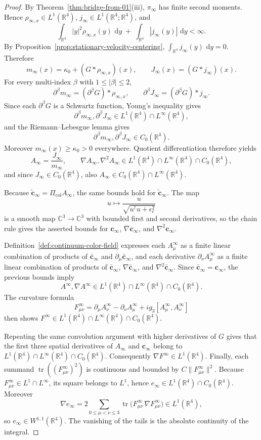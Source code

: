 \documentclass[11pt]{article}
\theoremstyle{definition}
\theoremstyle{remark}
\newcommand{\R}{\mathbb R}
\newcommand{\C}{\mathbb C}
\newcommand{\dd}{\,\mathrm d}
\newcommand{\tr}{\operatorname{tr}}
\begin{document}
\begin{proof}
By Theorem~\ref{thm:bridge-from-01}\textnormal{(iii)}, \(\pi_\infty\) has finite
second moments. Hence \(\rho_{\infty,x}\in L^1(\R^4)\), \(j_\infty\in L^1(\R^4;\R^4)\),
and
\[
\int_{\R^4}|y|^2\rho_{\infty,x}(y)\,\dd y
\;+\;
\int_{\R^4}|j_\infty(y)|\,\dd y
<\infty.
\]
By Proposition~\ref{prop:stationary-velocity-centering},
\(\int_{\R^4}j_\infty(y)\,\dd y=0\). Therefore
\[
m_\infty(x)=\kappa_0+(G*\rho_{\infty,x})(x),
\qquad
J_\infty(x)=(G*j_\infty)(x).
\]
For every multi-index \(\beta\) with \(1\le|\beta|\le2\),
\[
\partial^\beta m_\infty=(\partial^\beta G)*\rho_{\infty,x},
\qquad
\partial^\beta J_\infty=(\partial^\beta G)*j_\infty.
\]
Since each \(\partial^\beta G\) is a Schwartz function, Young's inequality gives
\[
\partial^\beta m_\infty,\partial^\beta J_\infty\in
L^1(\R^4)\cap L^\infty(\R^4),
\]
and the Riemann--Lebesgue lemma gives
\[
\partial^\beta m_\infty,\partial^\beta J_\infty\in C_0(\R^4).
\]
Moreover \(m_\infty(x)\ge\kappa_0>0\) everywhere. Quotient differentiation
therefore yields
\[
A_\infty=\frac{J_\infty}{m_\infty},
\qquad
\nabla A_\infty,\nabla^2A_\infty\in
L^1(\R^4)\cap L^\infty(\R^4)\cap C_0(\R^4),
\]
and since \(J_\infty\in C_0(\R^4)\), also \(A_\infty\in C_0(\R^4)\cap L^\infty(\R^4)\).

Because \(\tilde{\mathbf c}_\infty=\Pi_{\mathrm{col}}A_\infty\), the same bounds
hold for \(\tilde{\mathbf c}_\infty\). The map
\[
u\mapsto \frac{u}{\sqrt{u^\dagger u+\epsilon_c^2}}
\]
is a smooth map \(\C^3\to\C^3\) with bounded first and second derivatives, so
the chain rule gives the asserted bounds for \(\mathbf c_\infty\),
\(\nabla\mathbf c_\infty\), and \(\nabla^2\mathbf c_\infty\).

Definition~\ref{def:continuum-color-field} expresses each \(A_\mu^\infty\) as a
finite linear combination of products of \(\bar{\mathbf c}_\infty\) and
\(\partial_\mu\bar{\mathbf c}_\infty\), and each derivative \(\partial_\nu
A_\mu^\infty\) as a finite linear combination of products of
\(\bar{\mathbf c}_\infty\), \(\nabla\bar{\mathbf c}_\infty\), and
\(\nabla^2\bar{\mathbf c}_\infty\). Since \(\bar{\mathbf c}_\infty=\mathbf c_\infty\),
the previous bounds imply
\[
A^\infty,\nabla A^\infty\in L^1(\R^4)\cap L^\infty(\R^4)\cap C_0(\R^4).
\]
The curvature formula
\[
F_{\mu\nu}^\infty
=
\partial_\mu A_\nu^\infty-\partial_\nu A_\mu^\infty+ig_3[A_\mu^\infty,A_\nu^\infty]
\]
then shows \(F^\infty\in L^1(\R^4)\cap L^\infty(\R^4)\cap C_0(\R^4)\).

Repeating the same convolution argument with higher derivatives of \(G\) gives
that the first three spatial derivatives of \(A_\infty\) and \(\mathbf c_\infty\)
belong to \(L^1(\R^4)\cap L^\infty(\R^4)\cap C_0(\R^4)\). Consequently
\(\nabla F^\infty\in L^1(\R^4)\). Finally, each summand
\(\tr((F_{\mu\nu}^\infty)^2)\) is continuous and bounded by
\(C\|F_{\mu\nu}^\infty\|^2\). Because \(F_{\mu\nu}^\infty\in L^1\cap L^\infty\),
its square belongs to \(L^1\), hence \(e_\infty\in L^1(\R^4)\cap C_0(\R^4)\).
Moreover
\[
\nabla e_\infty
=
2\sum_{0\le\mu<\nu\le3}\tr\!\bigl(F_{\mu\nu}^\infty\,\nabla F_{\mu\nu}^\infty\bigr)
\in L^1(\R^4),
\]
so \(e_\infty\in W^{1,1}(\R^4)\).
The vanishing of the tails is the absolute continuity of the integral.
\end{proof}
\end{document}
